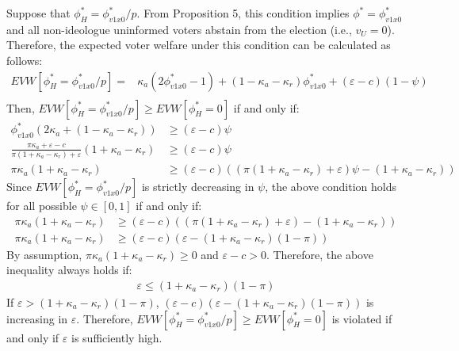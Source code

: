\par Suppose that $\phi^*_H=\phi^*_{v1x0}/p$. From Proposition 5, this condition implies $\phi^*=\phi^*_{v1x0}$ and all non-ideologue uninformed voters abstain from the election (i.e., $v_U=0$). Therefore, the expected voter welfare under this condition can be calculated as follows:
\begin{align*}
EVW[\phi^*_H=\phi^*_{v1x0}/p] =& \kappa_a (2\phi^*_{v1x0}-1) + (1-\kappa_a-\kappa_r)\phi^*_{v1x0} + (\varepsilon-c)(1-\psi) \\
\end{align*}
\noindent Then, $EVW[\phi^*_H=\phi^*_{v1x0}/p] \geq EVW[\phi^*_H=0]$ if and only if:
\begin{align*}
\phi^*_{v1x0} (2\kappa_a + (1-\kappa_a-\kappa_r)) &\geq (\varepsilon-c) \psi \\
\frac{\pi \kappa_{a} + \varepsilon - c}{\pi (1 + \kappa_{a}-\kappa_{r} ) + \varepsilon} (1+\kappa_a-\kappa_r) &\geq (\varepsilon-c) \psi \\
\pi \kappa_{a} (1+\kappa_a-\kappa_r) &\geq (\varepsilon-c) ( (\pi (1 + \kappa_{a}-\kappa_{r} ) + \varepsilon) \psi - (1+\kappa_a-\kappa_r) )
\end{align*}
\noindent Since $EVW[\phi^*_H=\phi^*_{v1x0}/p]$ is strictly decreasing in $\psi$, the above condition holds for all possible $\psi \in [0,1]$ if and only if:
\begin{align*}
\pi \kappa_{a} (1+\kappa_a-\kappa_r) &\geq (\varepsilon-c) ( (\pi (1 + \kappa_{a}-\kappa_{r} ) + \varepsilon) - (1+\kappa_a-\kappa_r) ) \\
\pi \kappa_{a} (1+\kappa_a-\kappa_r) &\geq (\varepsilon-c) ( \varepsilon - (1+\kappa_a-\kappa_r)(1-\pi) ) 
\end{align*}
\noindent By assumption, $\pi \kappa_{a} (1+\kappa_a-\kappa_r) \geq 0$ and $\varepsilon-c>0$. Therefore, the above inequality always holds if:
\begin{align*}
\varepsilon \leq (1+\kappa_a-\kappa_r)(1-\pi) 
\end{align*}
\noindent If $\varepsilon > (1+\kappa_a-\kappa_r)(1-\pi)$, $(\varepsilon-c) ( \varepsilon - (1+\kappa_a-\kappa_r)(1-\pi) )$ is increasing in $\varepsilon$. Therefore, $EVW[\phi^*_H=\phi^*_{v1x0}/p] \geq EVW[\phi^*_H=0]$ is violated if and only if $\varepsilon$ is sufficiently high. 

